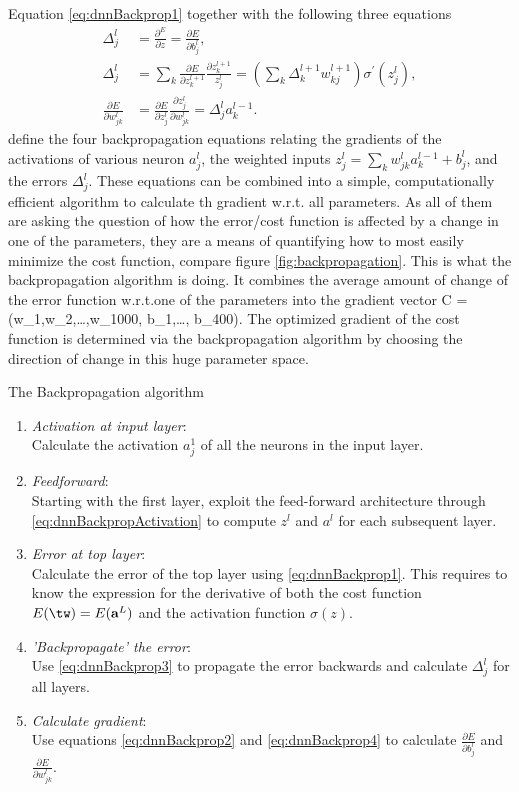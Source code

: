 Equation \ref{eq:dnnBackprop1} together with the following three equations
\begin{align}
	\Delta^l_j&= \frac{\partial^E}{\partial z} = \frac{\partial E}{\partial b^l_j}, \label{eq:dnnBackprop2} \\
	\Delta^l_j &= \sum_k \frac{\partial E}{\partial z^{l+1}_k} \frac{\partial z^{l+1}_k}{z^l_j} =\left(\sum_k \Delta^{l+1}_k w^{l+1}_{kj} \right) \sigma^\prime(z^l_j), \label{eq:dnnBackprop3} \\
	\frac{\partial E}{\partial w^l_{jk}} &= \frac{\partial E}{\partial z^l_j} \frac{\partial z^l_j}{\partial w^l_{jk}} = \Delta^l_j a^{l-1}_k.\label{eq:dnnBackprop4}
\end{align}
define the four backpropagation equations relating the gradients of the activations of various neuron $a^l_j$, the weighted inputs $z^l_j=\sum_k w^l_{jk} a^{l-1}_k +b^l_j$, and the errors $\Delta^l_j$. These equations can be combined into a simple, computationally efficient algorithm to calculate th gradient w.r.t. all parameters. As all of them are asking the question of how the error/cost function is affected by a change in one of the parameters, they are  a means of quantifying how to most easily minimize the cost function, compare figure \ref{fig:backpropagation}. This is what the backpropagation algorithm is doing. It combines the average amount of change of the error function w.r.t.one of the parameters into the gradient vector
\bse 
\vec{\nabla} C = (w_1,w_2,\dots,w_{1000}, b_1,\dots, b_{400}).
\ese 
The optimized gradient of the cost function is determined via the backpropagation algorithm by choosing the direction of change in this huge parameter space.
\begin{mybox}{The Backpropagation algorithm}
	\begin{enumerate}
		\item \emph{Activation at input layer}:\\
		Calculate the activation $a^1_j$ of all the neurons in the input layer.
		\item \emph{Feedforward}:\\
		Starting with the first layer, exploit the feed-forward architecture through \ref{eq:dnnBackpropActivation} to compute $z^l$ and $a^l$ for each subsequent layer.
		\item \emph{Error at top layer}:\\
		Calculate the error of the top layer using \ref{eq:dnnBackprop1}. This requires to know the expression for the derivative of both the cost function $E(\tw)=E(\textbf{a}^L)$ and the activation function $\sigma(z)$.
		\item \emph{’Backpropagate’ the error}:\\
		Use \ref{eq:dnnBackprop3} to propagate the error backwards and calculate $\Delta^l_j$ for all layers. 
		\item \emph{Calculate gradient}:\\
		Use equations \ref{eq:dnnBackprop2} and \ref{eq:dnnBackprop4} to calculate $\frac{\partial E}{\partial b^l_j}$ and $\frac{\partial E}{\partial w^l_{jk}}$.
	\end{enumerate}
\end{mybox}
